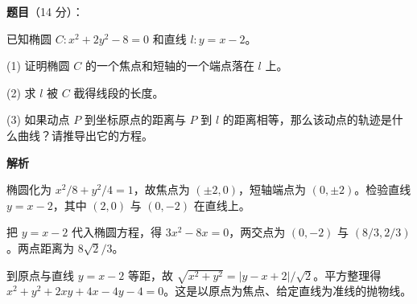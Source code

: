 \begin{answer}

\textbf{题目}（14 分）：

已知椭圆 $C:x^2+2y^2-8=0$ 和直线 $l:y=x-2$。

(1) 证明椭圆 $C$ 的一个焦点和短轴的一个端点落在 $l$ 上。

(2) 求 $l$ 被 $C$ 截得线段的长度。

(3) 如果动点 $P$ 到坐标原点的距离与 $P$ 到 $l$ 的距离相等，那么该动点的轨迹是什么曲线？请推导出它的方程。

\textbf{解析}


椭圆化为 $x^2/8+y^2/4=1$，故焦点为 $(\pm2,0)$，短轴端点为 $(0,\pm2)$。检验直线 $y=x-2$，其中 $(2,0)$ 与 $(0,-2)$ 在直线上。


把 $y=x-2$ 代入椭圆方程，得 $3x^2-8x=0$，两交点为 $(0,-2)$ 与 $(8/3,2/3)$。两点距离为 $8\sqrt2/3$。


到原点与直线 $y=x-2$ 等距，故 $\sqrt{x^2+y^2}=|y-x+2|/\sqrt2$。平方整理得 $x^2+y^2+2xy+4x-4y-4=0$。这是以原点为焦点、给定直线为准线的抛物线。




\end{answer}
